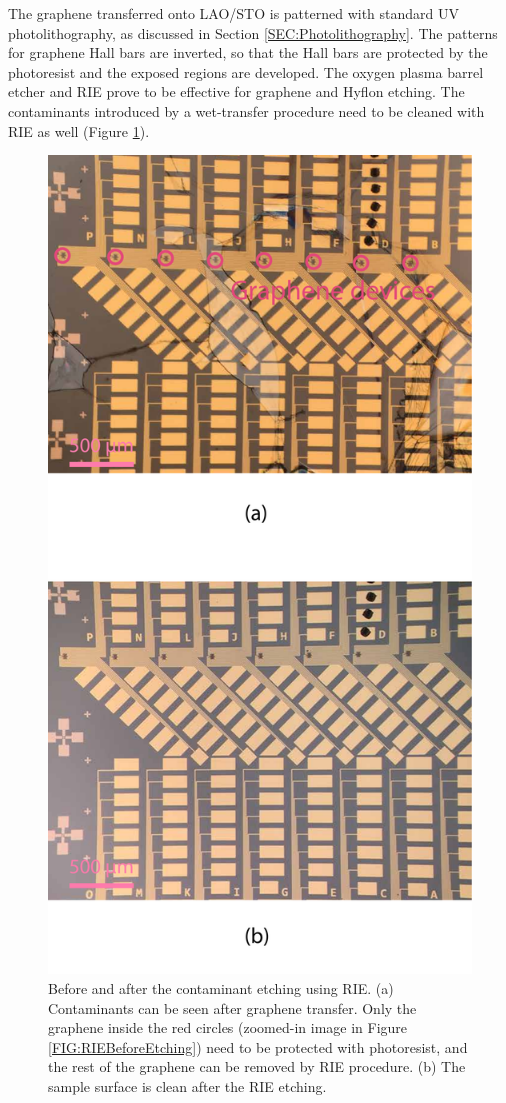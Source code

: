 \documentclass[pdflatex, sectionletters, 12pt, final, phd]{pittetd}    %
\begin{document}
The graphene transferred onto LAO/STO is patterned with standard UV photolithography, as discussed in Section \ref{SEC:Photolithography}. The patterns for graphene Hall bars are inverted, so that the Hall bars are protected by the photoresist and the exposed regions are developed. The oxygen plasma barrel etcher and RIE prove to be effective for graphene and Hyflon etching. The contaminants introduced by a wet-transfer procedure need to be cleaned with RIE as well (Figure \ref{FIG:SampleContaminant}). 

\begin{figure}[p]
	\centering
	\includegraphics[width=.55\textwidth]{Drawing/SampleContaminant.pdf}
	\caption[Before and after the contaminant etching using RIE]{Before and after the contaminant etching using RIE. (a) Contaminants can be seen after graphene transfer. Only the graphene inside the red circles (zoomed-in image in Figure \ref{FIG:RIEBeforeEtching}) need to be protected with photoresist, and the rest of the graphene can be removed by RIE procedure. (b) The sample surface is clean after the RIE etching.}
	\label{FIG:SampleContaminant}
\end{figure}
\end{document}
